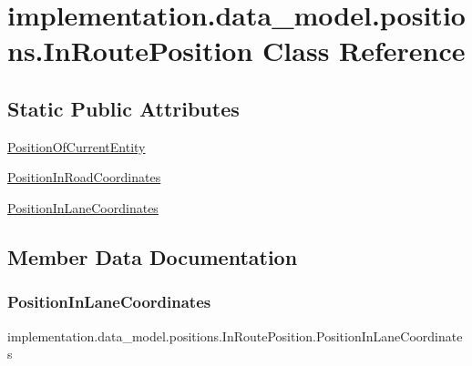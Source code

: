 \hypertarget{classimplementation_1_1data__model_1_1positions_1_1_in_route_position}{}\section{implementation.\+data\+\_\+model.\+positions.\+In\+Route\+Position Class Reference}
\label{classimplementation_1_1data__model_1_1positions_1_1_in_route_position}
\subsection*{Static Public Attributes}
\begin{DoxyCompactItemize}
\item 
\hyperlink{classimplementation_1_1data__model_1_1positions_1_1_in_route_position_a1ae2ad89868f70da9497da872c849bd9}{Position\+Of\+Current\+Entity}
\item 
\hyperlink{classimplementation_1_1data__model_1_1positions_1_1_in_route_position_a2bb8fcf429c82f6601615c3480400827}{Position\+In\+Road\+Coordinates}
\item 
\hyperlink{classimplementation_1_1data__model_1_1positions_1_1_in_route_position_a113f40938b26b069ebf13ea23fdc3338}{Position\+In\+Lane\+Coordinates}
\end{DoxyCompactItemize}


\subsection{Member Data Documentation}
\mbox{\label{classimplementation_1_1data__model_1_1positions_1_1_in_route_position_a113f40938b26b069ebf13ea23fdc3338}} 
\subsubsection{\texorpdfstring{Position\+In\+Lane\+Coordinates}{PositionInLaneCoordinates}}
{\footnotesize\ttfamily implementation.\+data\+\_\+model.\+positions.\+In\+Route\+Position.\+Position\+In\+Lane\+Coordinates\hspace{0.3cm}{\ttfamily [static]}}

